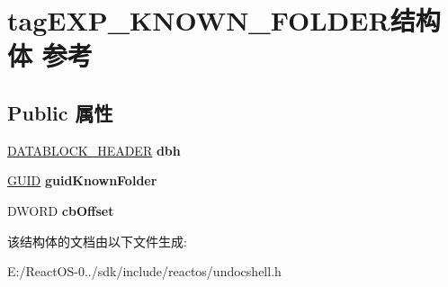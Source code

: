 \hypertarget{structtag_e_x_p___k_n_o_w_n___f_o_l_d_e_r}{}\section{tag\+E\+X\+P\+\_\+\+K\+N\+O\+W\+N\+\_\+\+F\+O\+L\+D\+E\+R结构体 参考}
\label{structtag_e_x_p___k_n_o_w_n___f_o_l_d_e_r}
\subsection*{Public 属性}
\begin{DoxyCompactItemize}
\item 
\mbox{\label{structtag_e_x_p___k_n_o_w_n___f_o_l_d_e_r_a22e7d8c425840101880b0c4fa0527091}} 
\hyperlink{structtag_d_a_t_a_b_l_o_c_k_h_e_a_d_e_r}{D\+A\+T\+A\+B\+L\+O\+C\+K\+\_\+\+H\+E\+A\+D\+ER} {\bfseries dbh}
\item 
\mbox{\label{structtag_e_x_p___k_n_o_w_n___f_o_l_d_e_r_ad398c2d9758a257bdf9cecd0b6be847e}} 
\hyperlink{interface_g_u_i_d}{G\+U\+ID} {\bfseries guid\+Known\+Folder}
\item 
\mbox{\label{structtag_e_x_p___k_n_o_w_n___f_o_l_d_e_r_a39472009608c154b40ec44c5e1db2853}} 
D\+W\+O\+RD {\bfseries cb\+Offset}
\end{DoxyCompactItemize}


该结构体的文档由以下文件生成\+:\begin{DoxyCompactItemize}
\item 
E\+:/\+React\+O\+S-\/0../sdk/include/reactos/undocshell.\+h\end{DoxyCompactItemize}
